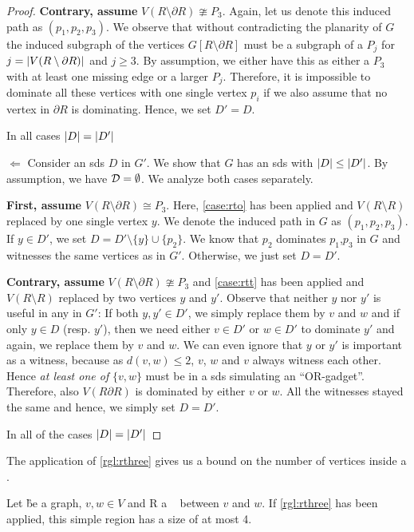 \begin{proof}
         \textbf{Contrary, assume} $V(R \setminus \partial R) \ncong P_3$. Again, let us denote this induced path as $(p_1,p_2,p_3)$. We observe that without contradicting the planarity of $G$ the induced subgraph of the vertices $G[R \setminus \partial R]$ must be a subgraph of a $P_j$ for $j = \abs{V(R \setminus \partial R)}$ and  $j \geq 3$.  By assumption, we either have this as either a $P_3$ with at least one missing edge or a larger $P_j$. Therefore, it is impossible to dominate all these vertices with one single vertex $p_i$ if we also assume that no vertex in $\partial R$ is dominating. Hence, we set $D' = D$.

         In all cases $\abs{D} = \abs{D'}$
        \item[$\Leftarrow$] Consider an sds $D$ in $G'$. We show that $G$ has an sds with $\abs{D} \leq \abs{D'}$. By assumption, we have $\mathcal{D} = \emptyset$. We analyze both cases separately.

         \textbf{First, assume} $V(R \setminus \partial R) \cong P_3$. Here, \cref{case:rto} has been applied and $V(R \setminus R)$ replaced by one single vertex $y$. We denote the induced path in $G$ as $(p_1,p_2,p_3)$.
         If $y \in D'$, we set $D = D' \setminus \{y\} \cup \{p_2\}$. We know that $p_2$ dominates $p_1$,$p_3$ in $G$ and witnesses the same vertices as in $G'$. 
         Otherwise, we just set $D = D'$. 

         \textbf{Contrary, assume} $V(R \setminus \partial R) \ncong P_3$ and \cref{case:rtt} has been applied and $V(R \setminus R)$ replaced by two vertices $y$ and $y'$. Observe that neither $y$ nor $y'$ is useful in any \sdom in $G'$: If both $y, y' \in D'$, we simply replace them by $v$ and $w$ and if only $y \in D$ (resp. $y'$), then we need either $v \in D'$ or $w \in D'$ to dominate $y'$ and again, we replace them by $v$ and $w$. 
         We can even ignore that $y$ or $y'$ is important as a witness, because as $d(v,w) \leq 2$, $v$, $w$ and $v$ always witness each other.
         Hence \textit{at least one of} $\{v,w \}$ must be in a sds simulating an ``OR-gadget''. Therefore, also $V(R \partial R)$ is dominated by either $v$ or $w$. All the witnesses stayed the same and hence, we simply set $D = D'$.
         
         In all of the cases $\abs{D} = \abs{D'}$
\end{proof}

The application of \cref{rgl:rthree} gives us a bound on the number of vertices inside a \sr. 
\begin{corollary}\label{lemma:simpleregionbound}
    Let \G be a graph, $v, w\in V$ and R a \sr~ between $v$ and $w$. If \cref{rgl:rthree} has been applied, this simple region has a size of at most 4.
\end{corollary}

